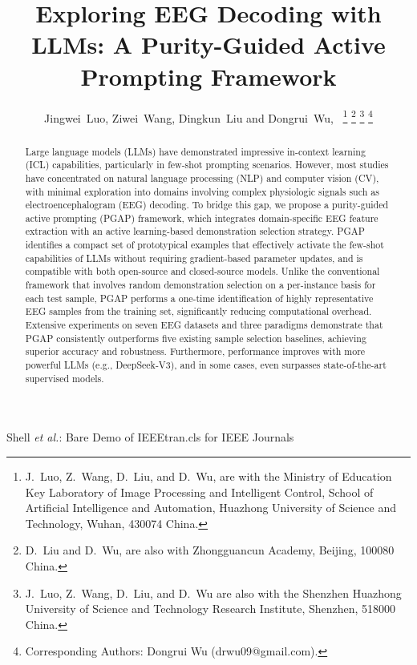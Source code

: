 \documentclass[journal,twocolumn]{IEEEtran}
\begin{document}
\title{Exploring EEG Decoding with LLMs: A Purity-Guided Active Prompting Framework}

\author{Jingwei~Luo, Ziwei~Wang, Dingkun~Liu and Dongrui~Wu,~
\thanks{J.~Luo, Z.~Wang, D.~Liu, and D.~Wu, are with the Ministry of Education Key Laboratory of Image Processing and Intelligent Control, School of Artificial Intelligence and Automation, Huazhong University of Science and Technology, Wuhan, 430074 China.}
\thanks{D.~Liu and D.~Wu, are also with Zhongguancun Academy, Beijing, 100080 China.}
\thanks{J.~Luo, Z.~Wang, D.~Liu, and D.~Wu are also with the Shenzhen Huazhong University of Science and Technology Research Institute, Shenzhen, 518000 China.}
\thanks{Corresponding Authors: Dongrui Wu (drwu09@gmail.com).}
}
\markboth{}%
{Shell \MakeLowercase{\textit{et al.}}: Bare Demo of IEEEtran.cls for IEEE Journals}
\maketitle

\begin{abstract}
Large language models (LLMs) have demonstrated impressive in-context learning (ICL) capabilities, particularly in few-shot prompting scenarios. However, most studies have concentrated on natural language processing (NLP) and computer vision (CV), with minimal exploration into domains involving complex physiologic signals such as electroencephalogram (EEG) decoding.
To bridge this gap, we propose a purity-guided active prompting (PGAP) framework, which integrates domain-specific EEG feature extraction with an active learning-based demonstration selection strategy. PGAP identifies a compact set of prototypical examples that effectively activate the few-shot capabilities of LLMs without requiring gradient-based parameter updates, and is compatible with both open-source and closed-source models.
Unlike the conventional framework that involves random demonstration selection on a per-instance basis for each test sample, PGAP performs a one-time identification of highly representative EEG samples from the training set, significantly reducing computational overhead.
Extensive experiments on seven EEG datasets and three paradigms demonstrate that PGAP consistently outperforms five existing sample selection baselines, achieving superior accuracy and robustness. Furthermore, performance improves with more powerful LLMs (e.g., DeepSeek-V3), and in some cases, even surpasses state-of-the-art supervised models.
\end{abstract}
\end{document}
